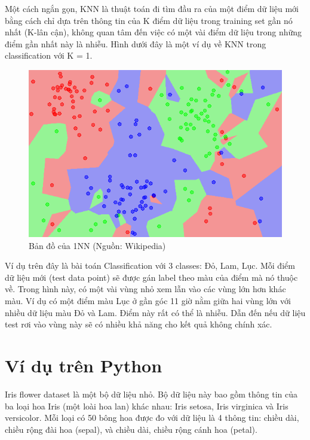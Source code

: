 \documentclass{article}
\begin{document}
Một cách ngắn gọn, KNN là thuật toán đi tìm đầu ra của một điểm dữ liệu mới bằng cách chỉ dựa trên thông tin của K điểm dữ liệu trong training set gần nó nhất (K-lân cận), không quan tâm đến việc có một vài điểm dữ liệu trong những điểm gần nhất này là nhiễu. Hình dưới đây là một ví dụ về KNN trong classification với K = 1.

\begin{center}
\begin{figure}[htp]
\begin{center}
\includegraphics[scale=.7]{Map1NN}
\end{center}
\caption{Bản đồ của 1NN (Nguồn: Wikipedia)}
\label{refhinh1}
\end{figure}
\end{center}

Ví dụ trên đây là bài toán Classification với 3 classes: Đỏ, Lam, Lục. Mỗi điểm dữ liệu mới (test data point) sẽ được gán label theo màu của điểm mà nó thuộc về. Trong hình này, có một vài vùng nhỏ xem lẫn vào các vùng lớn hơn khác màu. Ví dụ có một điểm màu Lục ở gần góc 11 giờ nằm giữa hai vùng lớn với nhiều dữ liệu màu Đỏ và Lam. Điểm này rất có thể là nhiễu. Dẫn đến nếu dữ liệu test rơi vào vùng này sẽ có nhiều khả năng cho kết quả không chính xác.

\section{Ví dụ trên Python}
Iris flower dataset là một bộ dữ liệu nhỏ. Bộ dữ liệu này bao gồm thông tin của ba loại hoa Iris (một loài hoa lan) khác nhau: Iris setosa, Iris virginica và Iris versicolor. Mỗi loại có 50 bông hoa được đo với dữ liệu là 4 thông tin: chiều dài, chiều rộng đài hoa (sepal), và chiều dài, chiều rộng cánh hoa (petal).
\end{document}
